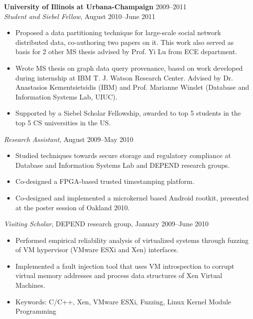 \documentclass[line,margin]{res}
\begin{document}
\begin{resume}
                \textbf{University of Illinois at Urbana-Champaign} \hfill 2009--2011 \\
                {\sl Student and Siebel Fellow}, August 2010--June 2011
                \begin{itemize}  \itemsep -2pt
                \item Proposed a data partitioning technique for large-scale social network distributed data, 
                co-authoring two papers on it.  This work also served as basis for 2 other MS thesis advised 
                by Prof. Yi Lu from ECE department.
                \item Wrote MS thesis on graph data query provenance, based on work developed during 
                internship at IBM T. J. Watson Research Center. Advised by Dr. Anastasios Kementsietsidis 
                (IBM) and Prof. Marianne Winslet (Database and Information Systems Lab, UIUC).
               \item Supported by a Siebel Scholar Fellowship, awarded to top 5 students in the top 5 CS 
                universities in the US.
                \end{itemize}
                {\sl Research Assistant}, August 2009--May 2010
                \begin{itemize}  \itemsep -2pt
                \item Studied techniques towards secure storage and regulatory compliance at Database
                and Information Systems Lab and DEPEND research groups.
                \item Co-designed a FPGA-based trusted timestamping platform.
                \item Co-designed and implemented a microkernel based Android rootkit, presented at the 
                poster session of Oakland 2010.
                \end{itemize}
                {\sl Visiting Scholar}, DEPEND research group, January 2009--June 2010
                \begin{itemize}  \itemsep -2pt
                \item Performed empirical reliability analysis of virtualized systems through fuzzing of VM 
                hypervisor (VMware ESXi and Xen) interfaces.
                \item Implemented a fault injection tool that uses VM introspection to corrupt virtual memory 
                addresses and process data structures of Xen Virtual Machines.
                \item Keywords: C/C++, Xen, VMware ESXi, Fuzzing, Linux Kernel Module Programming
                \end{itemize}
                

\end{resume}
\end{document}
